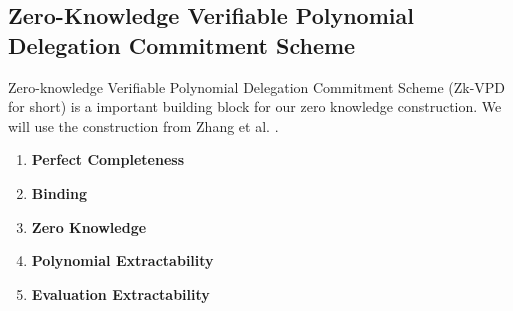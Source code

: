 
\subsection{Zero-Knowledge Verifiable Polynomial Delegation Commitment Scheme}

Zero-knowledge Verifiable Polynomial Delegation Commitment Scheme (Zk-VPD for short) is a important building block for our zero knowledge construction. We will use the construction from Zhang et al. \cite{zkvpd}.

\begin{definition}
	\label{def::zkvpd}
	\begin{enumerate}
		\item \textbf{Perfect Completeness}
		\item \textbf{Binding}
		\item \textbf{Zero Knowledge}
		\item \textbf{Polynomial Extractability}
		\item \textbf{Evaluation Extractability}
	\end{enumerate}
\end{definition}